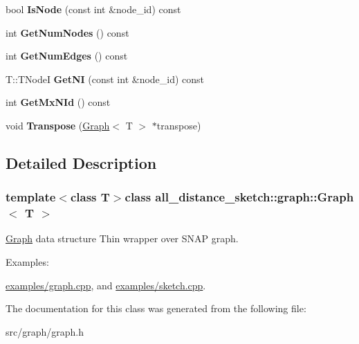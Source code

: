\begin{DoxyCompactItemize}
\item 
\hypertarget{classall__distance__sketch_1_1graph_1_1Graph_af60cf04a3c05dfffe37f7112b6c48b0c}{}bool {\bfseries Is\+Node} (const int \&node\+\_\+id) const \label{classall__distance__sketch_1_1graph_1_1Graph_af60cf04a3c05dfffe37f7112b6c48b0c}

\item 
\hypertarget{classall__distance__sketch_1_1graph_1_1Graph_ac15516bbdf0a0784ae08f36ffe6d127d}{}int {\bfseries Get\+Num\+Nodes} () const \label{classall__distance__sketch_1_1graph_1_1Graph_ac15516bbdf0a0784ae08f36ffe6d127d}

\item 
\hypertarget{classall__distance__sketch_1_1graph_1_1Graph_af5ec8f358494cd0ee09ebb4a772bdb40}{}int {\bfseries Get\+Num\+Edges} () const \label{classall__distance__sketch_1_1graph_1_1Graph_af5ec8f358494cd0ee09ebb4a772bdb40}

\item 
\hypertarget{classall__distance__sketch_1_1graph_1_1Graph_a13b839edcd7636b5c85a6b8ce3883f9d}{}T\+::\+T\+Node\+I {\bfseries Get\+N\+I} (const int \&node\+\_\+id) const \label{classall__distance__sketch_1_1graph_1_1Graph_a13b839edcd7636b5c85a6b8ce3883f9d}

\item 
\hypertarget{classall__distance__sketch_1_1graph_1_1Graph_a85ded127ea770a1132802e6828ba231a}{}int {\bfseries Get\+Mx\+N\+Id} () const \label{classall__distance__sketch_1_1graph_1_1Graph_a85ded127ea770a1132802e6828ba231a}

\item 
\hypertarget{classall__distance__sketch_1_1graph_1_1Graph_a815e0dd181344a9834b65021f2973887}{}void {\bfseries Transpose} (\hyperlink{classall__distance__sketch_1_1graph_1_1Graph}{Graph}$<$ T $>$ $\ast$transpose)\label{classall__distance__sketch_1_1graph_1_1Graph_a815e0dd181344a9834b65021f2973887}

\end{DoxyCompactItemize}


\subsection{Detailed Description}
\subsubsection*{template$<$class T$>$class all\+\_\+distance\+\_\+sketch\+::graph\+::\+Graph$<$ T $>$}

\hyperlink{classall__distance__sketch_1_1graph_1_1Graph}{Graph} data structure Thin wrapper over S\+N\+A\+P graph. \begin{Desc}
\item[Examples\+: ]\par
\hyperlink{examples_2graph_8cpp-example}{examples/graph.\+cpp}, and \hyperlink{examples_2sketch_8cpp-example}{examples/sketch.\+cpp}.\end{Desc}


The documentation for this class was generated from the following file\+:\begin{DoxyCompactItemize}
\item 
src/graph/graph.\+h\end{DoxyCompactItemize}
